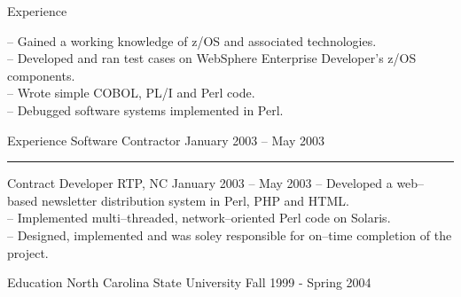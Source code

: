 \documentclass[letterpaper, 11pt]{article}
\begin{document}
\begin{resume}
\begin{category}{Experience}
\begin{block}
                -- Gained a working knowledge of z/OS and associated technologies.                      \\
                -- Developed and ran test cases on WebSphere Enterprise Developer's z/OS components.    \\
                -- Wrote simple COBOL, PL/I and Perl code.                                              \\
                -- Debugged software systems implemented in Perl.
            \end{block}
        \end{category}
        \begin{category}{Experience}
             {Software Contractor}
                     {}               {January 2003 -- May 2003}
            \rule{\textwidth}{1pt}
            \begin{block}
                 {Contract Developer}
                         {RTP, NC}        {January 2003 -- May 2003}
                -- Developed a web--based newsletter distribution system in Perl, PHP and HTML.            \\
                -- Implemented multi--threaded, network--oriented Perl code on Solaris.                    \\
                -- Designed, implemented and was soley responsible for on--time completion of the project.
            \end{block}
        \end{category}
        \begin{category}{Education}
             {North Carolina State University}
                     { }                        {Fall 1999 - Spring 2004}
        \end{category}
    \end{resume}
\end{document}
